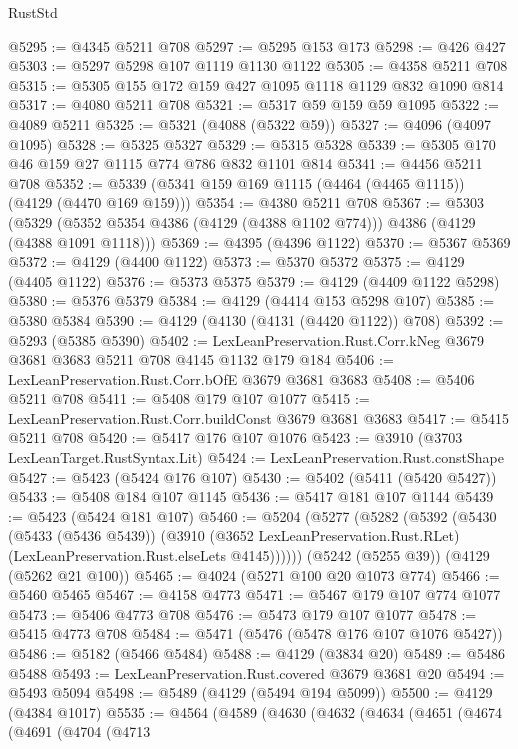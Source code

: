\begin{lexlean}{RustStd}
\begin{coremodule}
{\begin{coremodule}
{{{{{{{{{{{{{{@5295 := @4345 @5211 @708
@5297 := @5295 @153 @173
@5298 := @426 @427
@5303 := @5297 @5298 @107 @1119 @1130 @1122
@5305 := @4358 @5211 @708
@5315 := @5305 @155 @172 @159 @427 @1095 @1118 @1129 @832 @1090 @814
@5317 := @4080 @5211 @708
@5321 := @5317 @59 @159 @59 @1095
@5322 := @4089 @5211
@5325 := @5321 (@4088 (@5322 @59))
@5327 := @4096 (@4097 @1095)
@5328 := @5325 @5327
@5329 := @5315 @5328
@5339 := @5305 @170 @46 @159 @27 @1115 @774 @786 @832 @1101 @814
@5341 := @4456 @5211 @708
@5352 := @5339 (@5341 @159 @169 @1115 (@4464 (@4465 @1115)) (@4129 (@4470 @169 @159)))
@5354 := @4380 @5211 @708
@5367 := @5303
    (@5329 (@5352 @5354 @4386 (@4129 (@4388 @1102 @774))) @4386 (@4129 (@4388 @1091 @1118)))
@5369 := @4395 (@4396 @1122)
@5370 := @5367 @5369
@5372 := @4129 (@4400 @1122)
@5373 := @5370 @5372
@5375 := @4129 (@4405 @1122)
@5376 := @5373 @5375
@5379 := @4129 (@4409 @1122 @5298)
@5380 := @5376 @5379
@5384 := @4129 (@4414 @153 @5298 @107)
@5385 := @5380 @5384
@5390 := @4129 (@4130 (@4131 (@4420 @1122)) @708)
@5392 := @5293 (@5385 @5390)
@5402 := LexLeanPreservation.Rust.Corr.kNeg @3679 @3681 @3683 @5211 @708 @4145 @1132 @179 @184
@5406 := LexLeanPreservation.Rust.Corr.bOfE @3679 @3681 @3683
@5408 := @5406 @5211 @708
@5411 := @5408 @179 @107 @1077
@5415 := LexLeanPreservation.Rust.Corr.buildConst @3679 @3681 @3683
@5417 := @5415 @5211 @708
@5420 := @5417 @176 @107 @1076
@5423 := @3910 (@3703 LexLeanTarget.RustSyntax.Lit)
@5424 := LexLeanPreservation.Rust.constShape
@5427 := @5423 (@5424 @176 @107)
@5430 := @5402 (@5411 (@5420 @5427))
@5433 := @5408 @184 @107 @1145
@5436 := @5417 @181 @107 @1144
@5439 := @5423 (@5424 @181 @107)
@5460 := @5204
    (@5277
      (@5282
        (@5392
          (@5430
            (@5433 (@5436 @5439))
            (@3910
              (@3652 LexLeanPreservation.Rust.RLet)
              (LexLeanPreservation.Rust.elseLets @4145))))))
    (@5242 (@5255 @39))
    (@4129 (@5262 @21 @100))
@5465 := @4024 (@5271 @100 @20 @1073 @774)
@5466 := @5460 @5465
@5467 := @4158 @4773
@5471 := @5467 @179 @107 @774 @1077
@5473 := @5406 @4773 @708
@5476 := @5473 @179 @107 @1077
@5478 := @5415 @4773 @708
@5484 := @5471 (@5476 (@5478 @176 @107 @1076 @5427))
@5486 := @5182 (@5466 @5484)
@5488 := @4129 (@3834 @20)
@5489 := @5486 @5488
@5493 := LexLeanPreservation.Rust.covered @3679 @3681 @20
@5494 := @5493 @5094
@5498 := @5489 (@4129 (@5494 @194 @5099))
@5500 := @4129 (@4384 @1017)
@5535 := @4564
    (@4589
      (@4630
        (@4632
          (@4634
            (@4651
              (@4674
                (@4691
                  (@4704
                    (@4713
}}}}}}}}}}}}}}
\end{coremodule}}
\end{coremodule}
\end{lexlean}
